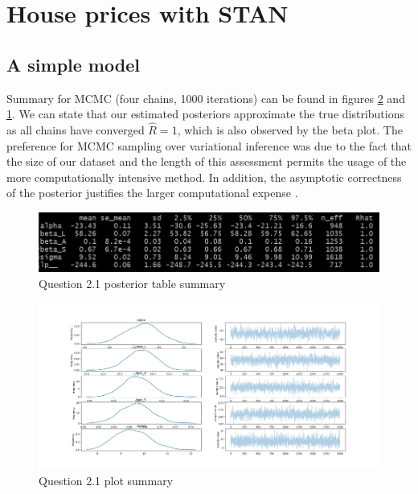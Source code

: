 \documentclass[11pt,a4paper]{article}
\begin{document}
\section{House prices with STAN}

  \subsection{A simple model}
  Summary for MCMC (four chains, 1000 iterations) can be found in figures \ref{fig:2.1} and \ref{tab:2.1}.
  We can state that our estimated posteriors approximate the true distributions as all chains have converged \(\hat{R} = 1\), which is also observed by the beta plot. The preference for MCMC sampling over variational inference was due to the fact that the size of our dataset and the length of this assessment permits the usage of the more computationally intensive method. In addition, the asymptotic correctness of the posterior justifies the larger computational expense \parencite{BleiVI}.

  \begin{figure}[htb]
    \centering
      \includegraphics[width=\textwidth]{../q21/q21_summary_table.png}
      \caption{Question 2.1 posterior table summary}
    \label{tab:2.1}
  \end{figure}

  \begin{figure}[htb]
    \centering
      \includegraphics[width=\textwidth]{../q21/separated_features.png}
      \caption{Question 2.1 plot summary}
    \label{fig:2.1}
  \end{figure}
\end{document}
